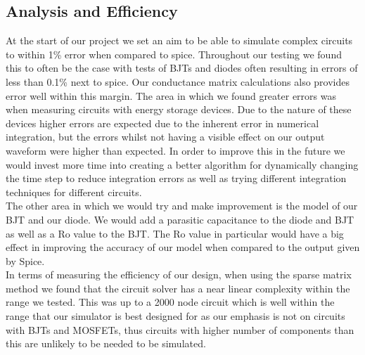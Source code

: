 \documentclass{article}
\begin{document}
\subsection{Analysis and Efficiency }
At the start of our project we set an aim to be able to simulate complex circuits to within 1\% error when compared to spice. Throughout our testing we found this to often be the case with tests of BJTs and diodes often resulting in errors of less than 0.1\% next to spice. Our conductance matrix calculations also provides error well within this margin. The area in which we found greater errors was when measuring circuits with energy storage devices. Due to the nature of these devices higher errors are expected due to the inherent error in numerical integration, but the errors whilst not having a visible effect on our output waveform were higher than expected. In order to improve this in the future we would invest more time into creating a better algorithm for dynamically changing the time step to reduce integration errors as well as trying different integration techniques for different circuits. \\The other area in which we would try and make improvement is the model of our BJT and our diode. We would add a parasitic capacitance to the diode and BJT as well as a Ro value to the BJT. The Ro value in particular would have a big effect in improving the accuracy of our model when compared to the output given by Spice. \\In terms of measuring the efficiency of our design, when using the sparse matrix method we found that the circuit solver has a near linear complexity within the range we tested. This was up to a 2000 node circuit which is well within the range that our simulator is best designed for as our emphasis is not on circuits with BJTs and MOSFETs, thus circuits with higher number of components than this are unlikely to be needed to be simulated.  

\newpage



\end{document}
